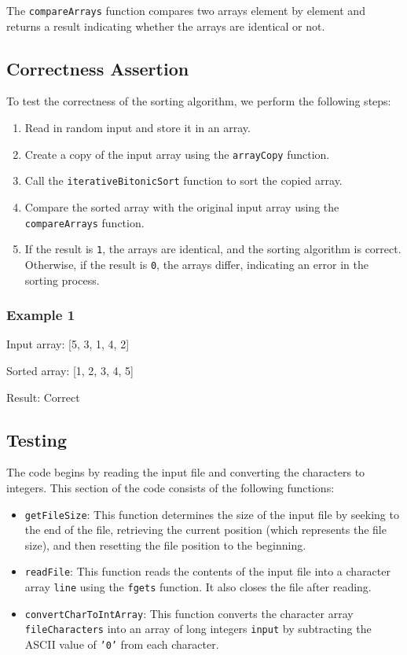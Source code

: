 The \texttt{compareArrays} function compares two arrays element by element and returns a result indicating whether the arrays are identical or not.

\subsection*{Correctness Assertion}

To test the correctness of the sorting algorithm, we perform the following steps:

\begin{enumerate}
  \item Read in random input and store it in an array.
  \item Create a copy of the input array using the \texttt{arrayCopy} function.
  \item Call the \texttt{iterativeBitonicSort} function to sort the copied array.
  \item Compare the sorted array with the original input array using the \texttt{compareArrays} function.
  \item If the result is \texttt{1}, the arrays are identical, and the sorting algorithm is correct. Otherwise, if the result is \texttt{0}, the arrays differ, indicating an error in the sorting process.
\end{enumerate}

\subsubsection*{Example 1}

Input array: [5, 3, 1, 4, 2]

Sorted array: [1, 2, 3, 4, 5]

Result: Correct
\subsection*{Testing}

The code begins by reading the input file and converting the characters to integers. This section of the code consists of the following functions:

\begin{itemize}
  \item \texttt{getFileSize}: This function determines the size of the input file by seeking to the end of the file, retrieving the current position (which represents the file size), and then resetting the file position to the beginning.
  \item \texttt{readFile}: This function reads the contents of the input file into a character array \texttt{line} using the \texttt{fgets} function. It also closes the file after reading.
  \item \texttt{convertCharToIntArray}: This function converts the character array \texttt{fileCharacters} into an array of long integers \texttt{input} by subtracting the ASCII value of \texttt{'0'} from each character.
\end{itemize}


